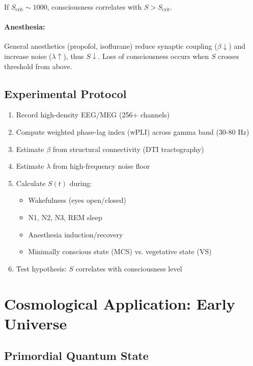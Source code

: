 \documentclass[12pt,a4paper]{article}
\begin{document}
If $S_{\text{crit}} \sim 1000$, consciousness correlates with $S > S_{\text{crit}}$.

\paragraph{Anesthesia:}
General anesthetics (propofol, isoflurane) reduce synaptic coupling ($\beta \downarrow$) and increase noise ($\lambda \uparrow$), thus $S \downarrow$. Loss of consciousness occurs when $S$ crosses threshold from above.

\subsection{Experimental Protocol}

\begin{enumerate}
    \item Record high-density EEG/MEG (256+ channels)
    \item Compute weighted phase-lag index (wPLI) across gamma band (30-80 Hz)
    \item Estimate $\beta$ from structural connectivity (DTI tractography)
    \item Estimate $\lambda$ from high-frequency noise floor
    \item Calculate $S(t)$ during:
    \begin{itemize}
        \item Wakefulness (eyes open/closed)
        \item N1, N2, N3, REM sleep
        \item Anesthesia induction/recovery
        \item Minimally conscious state (MCS) vs. vegetative state (VS)
    \end{itemize}
    \item Test hypothesis: $S$ correlates with consciousness level
\end{enumerate}

\section{Cosmological Application: Early Universe}

\subsection{Primordial Quantum State}
\end{document}
